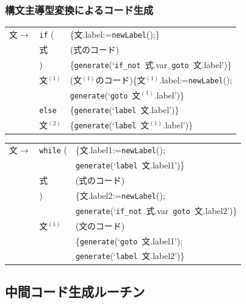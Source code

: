 \documentclass[dvipdfmx]{beamer}
\newcommand{\makenewlabel}{{\tt newLabel}()}
\newcommand{\genlabel}[1]{{\tt generate}(`{\tt label}\ {#1}')}
\newcommand{\genifnot}[2]{{\tt generate}(`{\tt if\_not}\ {#1}\ {\tt goto}\ {#2}')}
\newcommand{\gengoto}[1]{{\tt generate}(`{\tt goto}\ {#1}')}
\begin{document}
\begin{frame}
  \frametitle{構文主導型変換によるコード生成}
  {\small
    \begin{tabular}{lll}
      文$\rightarrow$ & {\tt if} (  & \{文.label:=\makenewlabel;\}                      \\
                     & 式           & (式のコード)                                          \\
                     & )           & \{\genifnot{式.var}{文.label}\}                    \\
                     & 文$^{(1)}$   & (文$^{(1)}$のコード)\{文$^{(1)}$.label:=\makenewlabel; \\
                     &             & \gengoto{文$^{(1)}$.label}\}                      \\
                     & {\tt else}  & \{\genlabel{文.label}\}                           \\
                     & 文{$^{(2)}$} & \{\genlabel{文$^{(1)}$.label}\}
    \end{tabular}

    \vspace*{1zw}

    \begin{tabular}{lll}
      文$\rightarrow$ & {\tt while} ( & \{文.label1:=\makenewlabel;   \\
                     &               & \genlabel{文.label1}\}        \\
                     & 式             & (式のコード)                      \\
                     & )             & \{文.label2:=\makenewlabel;   \\
                     &               & \genifnot{式.var}{文.label2}\} \\
                     & 文$^{(1)}$     & (文のコード)                      \\
                     &               & \{\gengoto{文.label1};        \\
                     &               & \genlabel{文.label2}\}        \\
    \end{tabular}
  }
\end{frame}

\subsection{中間コード生成ルーチン}
\end{document}
